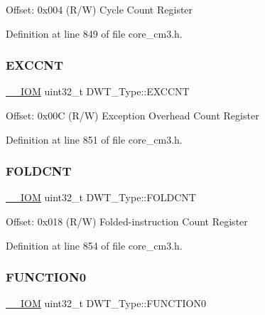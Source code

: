 Offset\+: 0x004 (R/W) Cycle Count Register 

Definition at line 849 of file core\+\_\+cm3.\+h.

\mbox{\label{struct_d_w_t___type_a9fe20c16c5167ca61486caf6832686d1}} 
\subsubsection{\texorpdfstring{E\+X\+C\+C\+NT}{EXCCNT}}
{\footnotesize\ttfamily \hyperlink{core__sc300_8h_ab6caba5853a60a17e8e04499b52bf691}{\+\_\+\+\_\+\+I\+OM} uint32\+\_\+t D\+W\+T\+\_\+\+Type\+::\+E\+X\+C\+C\+NT}

Offset\+: 0x00C (R/W) Exception Overhead Count Register 

Definition at line 851 of file core\+\_\+cm3.\+h.

\mbox{\label{struct_d_w_t___type_a1cfc48384ebd8fd8fb7e5d955aae6c97}} 
\subsubsection{\texorpdfstring{F\+O\+L\+D\+C\+NT}{FOLDCNT}}
{\footnotesize\ttfamily \hyperlink{core__sc300_8h_ab6caba5853a60a17e8e04499b52bf691}{\+\_\+\+\_\+\+I\+OM} uint32\+\_\+t D\+W\+T\+\_\+\+Type\+::\+F\+O\+L\+D\+C\+NT}

Offset\+: 0x018 (R/W) Folded-\/instruction Count Register 

Definition at line 854 of file core\+\_\+cm3.\+h.

\mbox{\label{struct_d_w_t___type_a579ae082f58a0317b7ef029b20f52889}} 
\subsubsection{\texorpdfstring{F\+U\+N\+C\+T\+I\+O\+N0}{FUNCTION0}}
{\footnotesize\ttfamily \hyperlink{core__sc300_8h_ab6caba5853a60a17e8e04499b52bf691}{\+\_\+\+\_\+\+I\+OM} uint32\+\_\+t D\+W\+T\+\_\+\+Type\+::\+F\+U\+N\+C\+T\+I\+O\+N0}

